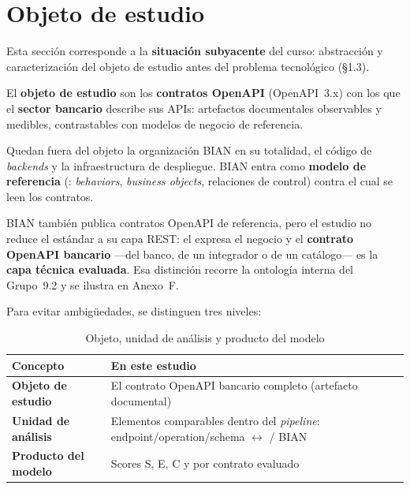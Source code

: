 \section{Objeto de estudio}
\label{sec:objeto-estudio}

Esta sección corresponde a la \textbf{situación subyacente} del curso: abstracción y
caracterización del objeto de estudio antes del problema tecnológico (§1.3).

El \textbf{objeto de estudio} son los \textbf{contratos OpenAPI} (OpenAPI~3.x) con los que el
\textbf{sector bancario} describe sus APIs: artefactos documentales observables y medibles,
contrastables con modelos de negocio de referencia.

Quedan fuera del objeto la organización BIAN en su totalidad, el código de \textit{backends} y la
infraestructura de despliegue. BIAN entra como \textbf{modelo de referencia} (\ServiceDomain{}:
\textit{behaviors}, \textit{business objects}, relaciones de control) contra el cual se leen los
contratos.

BIAN también publica contratos OpenAPI de referencia, pero el estudio no reduce el estándar a su
capa REST: el \ServiceDomain{} expresa el negocio y el \textbf{contrato OpenAPI bancario}
---del banco, de un integrador o de un catálogo--- es la \textbf{capa técnica evaluada}. Esa
distinción recorre la ontología interna del Grupo~9.2 y se ilustra en Anexo~F.

Para evitar ambigüedades, se distinguen tres niveles:

\begin{table}[H]
  \centering
  \caption{Objeto, unidad de análisis y producto del modelo}
  \label{tab:objeto-unidad-producto}
  \begin{tabular}{@{}p{}p{}@{}}
    \toprule
    \textbf{Concepto} & \textbf{En este estudio} \\
    \midrule
    \textbf{Objeto de estudio} & El contrato OpenAPI bancario completo (artefacto documental) \\
    \textbf{Unidad de análisis} &
    Elementos comparables dentro del \textit{pipeline}: endpoint/operation/schema $\leftrightarrow$
    \Behavior{} / \BusinessObject{} BIAN \\
    \textbf{Producto del modelo} & Scores S, E, C y \AlignmentScore{} por contrato evaluado \\
    \bottomrule
  \end{tabular}
\end{table}

